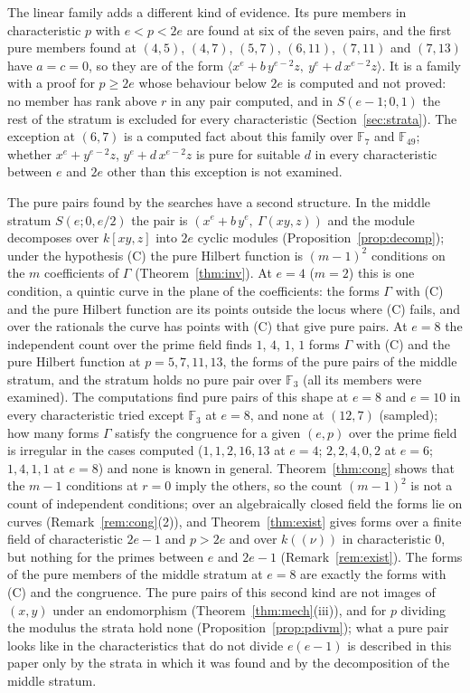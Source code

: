\documentclass[11pt]{article}
\theoremstyle{definition}
\theoremstyle{remark}
\newcommand{\F}{\mathbb{F}}
\begin{document}
The linear family adds a different kind of evidence. Its pure members in characteristic $p$ with $e<p<2e$ are found at six of the seven pairs, and the first pure members found at $(4,5)$, $(4,7)$, $(5,7)$, $(6,11)$, $(7,11)$ and $(7,13)$ have $a=c=0$, so they are of the form $\langle x^e+b\,y^{e-2}z,\ y^e+d\,x^{e-2}z\rangle$. It is a family with a proof for $p\ge2e$ whose behaviour below $2e$ is computed and not proved: no member has rank above $r$ in any pair computed, and in $S(e-1;0,1)$ the rest of the stratum is excluded for every characteristic (Section~\ref{sec:strata}). The exception at $(6,7)$ is a computed fact about this family over $\F_7$ and $\F_{49}$; whether $x^e+y^{e-2}z$, $y^e+d\,x^{e-2}z$ is pure for suitable $d$ in every characteristic between $e$ and $2e$ other than this exception is not examined.

The pure pairs found by the searches have a second structure. In the middle stratum $S(e;0,e/2)$ the pair is $(x^e+b\,y^e,\ \Gamma(xy,z))$ and the module decomposes over $k[xy,z]$ into $2e$ cyclic modules (Proposition~\ref{prop:decomp}); under the hypothesis (C) the pure Hilbert function is $(m-1)^2$ conditions on the $m$ coefficients of $\Gamma$ (Theorem~\ref{thm:inv}). At $e=4$ ($m=2$) this is one condition, a quintic curve in the plane of the coefficients: the forms $\Gamma$ with (C) and the pure Hilbert function are its points outside the locus where (C) fails, and over the rationals the curve has points with (C) that give pure pairs. At $e=8$ the independent count over the prime field finds $1$, $4$, $1$, $1$ forms $\Gamma$ with (C) and the pure Hilbert function at $p=5,7,11,13$, the forms of the pure pairs of the middle stratum, and the stratum holds no pure pair over $\F_3$ (all its members were examined). The computations find pure pairs of this shape at $e=8$ and $e=10$ in every characteristic tried except $\F_3$ at $e=8$, and none at $(12,7)$ (sampled); how many forms $\Gamma$ satisfy the congruence for a given $(e,p)$ over the prime field is irregular in the cases computed ($1,1,2,16,13$ at $e=4$; $2,2,4,0,2$ at $e=6$; $1,4,1,1$ at $e=8$) and none is known in general. Theorem~\ref{thm:cong} shows that the $m-1$ conditions at $r=0$ imply the others, so the count $(m-1)^2$ is not a count of independent conditions; over an algebraically closed field the forms lie on curves (Remark~\ref{rem:cong}(2)), and Theorem~\ref{thm:exist} gives forms over a finite field of characteristic $2e-1$ and $p>2e$ and over $k((\nu))$ in characteristic $0$, but nothing for the primes between $e$ and $2e-1$ (Remark~\ref{rem:exist}). The forms of the pure members of the middle stratum at $e=8$ are exactly the forms with (C) and the congruence. The pure pairs of this second kind are not images of $(x,y)$ under an endomorphism (Theorem~\ref{thm:mech}(iii)), and for $p$ dividing the modulus the strata hold none (Proposition~\ref{prop:pdivm}); what a pure pair looks like in the characteristics that do not divide $e(e-1)$ is described in this paper only by the strata in which it was found and by the decomposition of the middle stratum.
\end{document}

